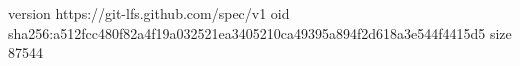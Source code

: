 version https://git-lfs.github.com/spec/v1
oid sha256:a512fcc480f82a4f19a032521ea3405210ca49395a894f2d618a3e544f4415d5
size 87544
